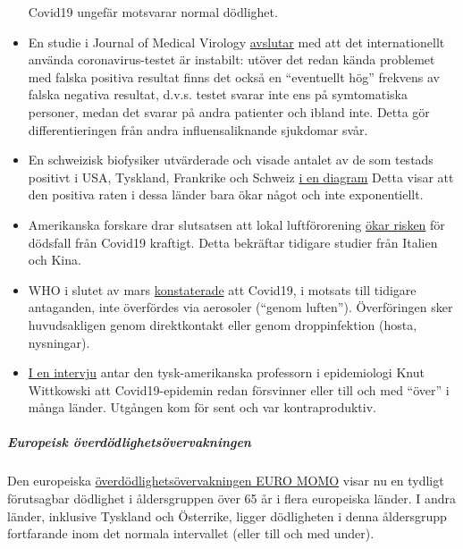 \begin{itemize}
  Covid19 ungefär motsvarar normal dödlighet.
\item
  En studie i Journal of Medical Virology
  \href{https://www.ncbi.nlm.nih.gov/pubmed/32219885}{avslutar} med att
  det internationellt använda coronavirus-testet är instabilt: utöver
  det redan kända problemet med falska positiva resultat finns det också
  en ``eventuellt hög'' frekvens av falska negativa resultat, d.v.s.
  testet svarar inte ens på symtomatiska personer, medan det svarar på
  andra patienter och ibland inte. Detta gör differentieringen från
  andra influensaliknande sjukdomar svår.
\item
  En schweizisk biofysiker utvärderade och visade antalet av de som
  testads positivt i USA, Tyskland, Frankrike och Schweiz
  \href{https://swprs.org/rate-of-positive-covid19-tests/}{i en diagram}
  Detta visar att den positiva raten i dessa länder bara ökar något och
  inte exponentiellt.
\item
  Amerikanska forskare drar slutsatsen att lokal luftförorening
  \href{https://www.heise.de/tp/features/Luftverschmutzung-erhoeht-Covid-19-Sterberisiko-4699306.html}{ökar
  risken} för dödsfall från Covid19 kraftigt. Detta bekräftar tidigare
  studier från Italien och Kina.
\item
  WHO i slutet av mars
  \href{https://www.who.int/news-room/commentaries/detail/modes-of-transmission-of-virus-causing-covid-19-implications-for-ipc-precaution-recommendations}{konstaterade}
  att Covid19, i motsats till tidigare antaganden, inte överfördes via
  aerosoler (``genom luften''). Överföringen sker huvudsakligen genom
  direktkontakt eller genom droppinfektion (hosta, nysningar).
\item
  \href{https://www.youtube.com/watch?v=ARTf4bpiXuI}{I en intervju}
  antar den tysk-amerikanska professorn i epidemiologi Knut Wittkowski
  att Covid19-epidemin redan försvinner eller till och med ``över'' i
  många länder. Utgången kom för sent och var kontraproduktiv.
\end{itemize}

\hypertarget{europeisk-uxf6verduxf6dlighetsuxf6vervakningen}{%
\subparagraph{\texorpdfstring{\textbf{Europeisk
överdödlighetsövervakningen}}{Europeisk överdödlighetsövervakningen}}\label{europeisk-uxf6verduxf6dlighetsuxf6vervakningen}}

Den europeiska
\href{https://www.euromomo.eu/outputs/zscore_country_total.html}{överdödlighetsövervakningen
EURO MOMO} visar nu en tydligt förutsagbar dödlighet i åldersgruppen
över 65 år i flera europeiska länder. I andra länder, inklusive Tyskland
och Österrike, ligger dödligheten i denna åldersgrupp fortfarande inom
det normala intervallet (eller till och med under).

